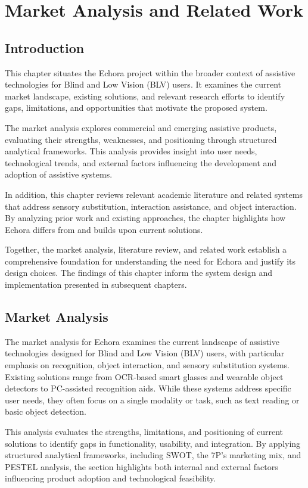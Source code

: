 \chapter{Market Analysis and Related Work}
\label{ch:ma}

\section{Introduction}
This chapter situates the Echora project within the broader context of assistive technologies for Blind and Low Vision (BLV) users. It examines the current market landscape, existing solutions, and relevant research efforts to identify gaps, limitations, and opportunities that motivate the proposed system.

The market analysis explores commercial and emerging assistive products, evaluating their strengths, weaknesses, and positioning through structured analytical frameworks. This analysis provides insight into user needs, technological trends, and external factors influencing the development and adoption of assistive systems.

In addition, this chapter reviews relevant academic literature and related systems that address sensory substitution, interaction assistance, and object interaction. By analyzing prior work and existing approaches, the chapter highlights how Echora differs from and builds upon current solutions.

Together, the market analysis, literature review, and related work establish a comprehensive foundation for understanding the need for Echora and justify its design choices. The findings of this chapter inform the system design and implementation presented in subsequent chapters.


\section{Market Analysis}

The market analysis for Echora examines the current landscape of assistive technologies designed for Blind and Low Vision (BLV) users, with particular emphasis on recognition, object interaction, and sensory substitution systems. Existing solutions range from OCR-based smart glasses and wearable object detectors to PC-assisted recognition aids. While these systems address specific user needs, they often focus on a single modality or task, such as text reading or basic object detection.

This analysis evaluates the strengths, limitations, and positioning of current solutions to identify gaps in functionality, usability, and integration. By applying structured analytical frameworks, including SWOT, the 7P’s marketing mix, and PESTEL analysis, the section highlights both internal and external factors influencing product adoption and technological feasibility.

